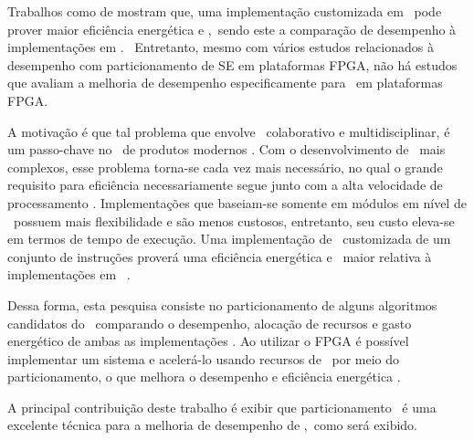     
    
    
    
    
    Trabalhos como de \citet{Zhang2008, BenHajHassine2017, Wolf1994, Stone2010} mostram que, uma implementação customizada em \hardware\ pode prover maior eficiência energética e \speedup,\ sendo este a comparação de desempenho à implementações em \software.\ 
    Entretanto, mesmo com vários estudos relacionados à desempenho com particionamento de SE em plataformas FPGA, não há estudos que avaliam a melhoria de desempenho especificamente para \wearables\ em plataformas FPGA.
    
    A motivação é que tal problema que envolve \design\ colaborativo e multidisciplinar, é um passo-chave no \design\ de produtos modernos \citep{Trappey2016}. 
    Com o desenvolvimento de \designs\ mais complexos, esse problema torna-se cada vez mais necessário, no qual o grande requisito para eficiência necessariamente segue junto com a alta velocidade de processamento \citep{Trindade2016, Arato2005, Yan2017}.
    Implementações que baseiam-se somente em módulos em nível de \software\ possuem mais flexibilidade e são menos custosos, entretanto, seu custo eleva-se em termos de tempo de execução. 
    Uma implementação de \hardware\ customizada de um conjunto de instruções proverá uma eficiência energética e \speedup\ maior relativa à implementações em \software\ \citep{Zhang2008, BenHajHassine2017, Wolf1994, Stone2010}.
    
    
    
    
    Dessa forma, esta pesquisa consiste no particionamento de alguns algoritmos candidatos do \wearable\ comparando o desempenho, alocação de recursos e gasto energético de ambas as implementações \hs.
    Ao utilizar o FPGA é possível implementar um sistema e acelerá-lo usando recursos de \hardware\ por meio do particionamento, o que melhora o desempenho e eficiência energética \citep{Cong2009, Lo2009, Zhang2008a}.
    
    
    A principal contribuição deste trabalho é exibir que particionamento \hs\ é uma excelente técnica para a melhoria de desempenho de \wearables,\ como será exibido.
    
